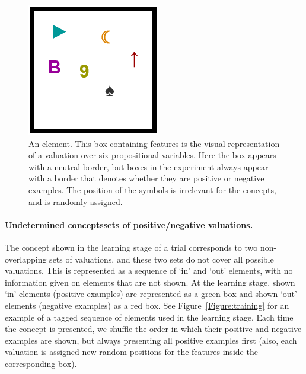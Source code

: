 \begin{figure}[h!] 
\begin{center}
    	\includegraphics[scale=0.6]{papers/images_behavior_research_methods/BordeNeutro.PNG}
	\caption{An element. This box containing features is the visual representation of a valuation over six propositional variables. Here the box appears with a neutral border, but boxes in the experiment always appear with a border that denotes whether they are positive or negative examples. The position of the symbols is irrelevant for the concepts, and is randomly assigned.}
	\label{Figure:element} 
\end{center}
\end{figure}


\paragraph{Undetermined concepts\textemdash sets of positive/negative valuations.}\label{IncompleteConcepts} The concept shown in the learning stage of a trial corresponds to two non-overlapping sets of valuations, and these two sets do not cover all possible valuations. This is represented as a sequence of `in' and `out' elements, with no information given on elements that are not shown. %
At the learning stage, shown `in' elements (positive examples) are represented as a green box and shown `out' elements (negative examples) as a red box. See Figure~\ref{Figure:training} for an example of a tagged sequence of elements used in the learning stage. Each time the concept is presented, we shuffle the order in which their positive and negative examples are shown, but always presenting all positive examples first (also, each valuation is assigned new random positions for the features inside the corresponding box). 

